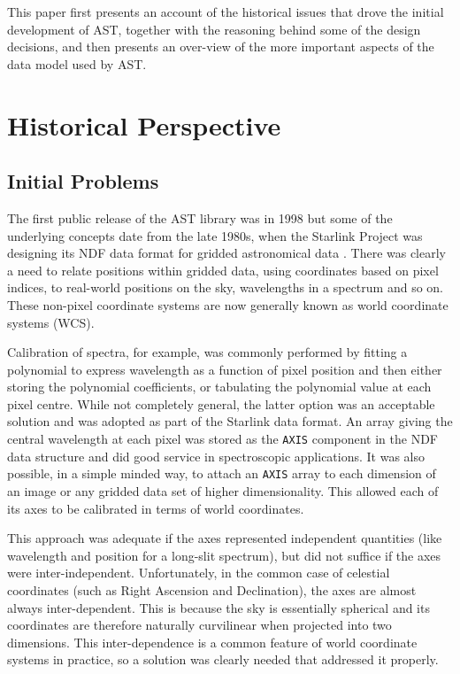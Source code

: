 \documentclass[final,authoryear,5p,times,twocolumn]{elsarticle}
\begin{document}
This paper first presents an account of the historical issues that drove
the initial development of AST, together with the reasoning behind some
of the design decisions, and then presents an over-view of the more
important aspects of the data model used by AST.

\section{Historical Perspective}

\subsection{Initial Problems}

The first public release of the AST library was in 1998
\citep{1998StarB..20....6L,1998StarB..20....7D} but some of the
underlying concepts date from the late 1980s, when the Starlink
Project was designing its NDF data format for gridded astronomical
data \citep{2015Jenness}. There was clearly a need to relate positions
within gridded data, using coordinates based on pixel indices, to
real-world positions on the sky, wavelengths in a spectrum and so
on. These non-pixel coordinate systems are now generally known as
world coordinate systems (WCS).

Calibration of spectra, for example, was commonly performed by fitting
a polynomial to express wavelength as a function of pixel position and
then either storing the polynomial coefficients, or tabulating the
polynomial value at each pixel centre. While not completely general,
the latter option was an acceptable solution and was adopted as part
of the Starlink data format. An array giving the central wavelength at
each pixel was stored as the \texttt{AXIS} component in the NDF data
structure and did good service in spectroscopic applications. It was
also possible, in a simple minded way, to attach an \texttt{AXIS}
array to each dimension of an image or any gridded data set of higher
dimensionality. This allowed each of its axes to be calibrated in
terms of world coordinates.

This approach was adequate if the axes represented independent
quantities (like wavelength and position for a long-slit spectrum),
but did not suffice if the axes were inter-independent. Unfortunately,
in the common case of celestial coordinates (such as Right Ascension
and Declination), the axes are almost always inter-dependent. This is
because the sky is essentially spherical and its coordinates are
therefore naturally curvilinear when projected into two
dimensions. This inter-dependence is a common feature of world
coordinate systems in practice, so a solution was clearly needed that
addressed it properly.
\end{document}
